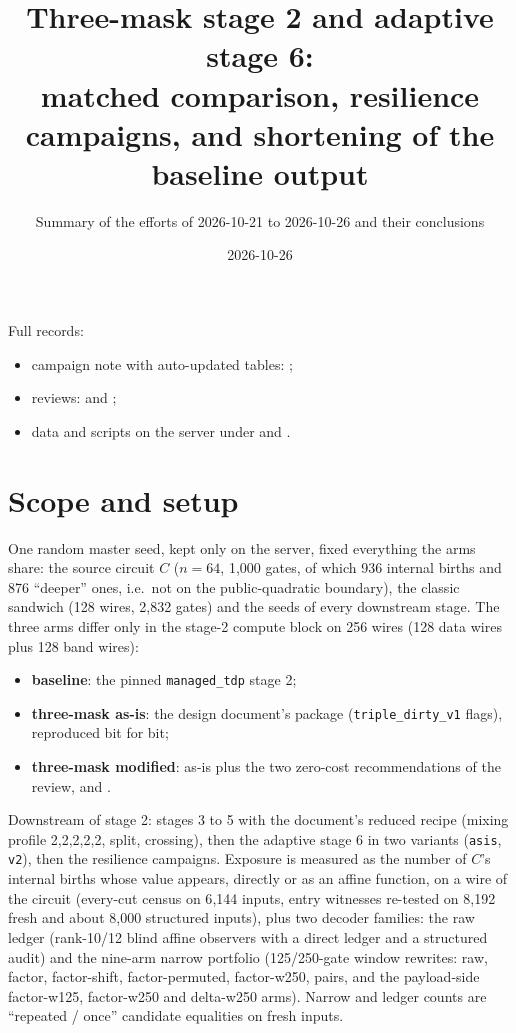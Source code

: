 \documentclass[11pt,a4paper]{article}
\title{Three-mask stage 2 and adaptive stage 6:\\matched comparison, resilience campaigns, and shortening of the baseline output}
\author{Summary of the efforts of 2026-10-21 to 2026-10-26 and their conclusions}
\date{2026-10-26}
\newcommand{\code}[1]{\texttt{#1}}
\begin{document}
\maketitle

\noindent Full records:
\begin{itemize}
\item campaign note with auto-updated tables: ;
\item reviews:  and ;
\item data and scripts on the server under  and .
\end{itemize}

\section{Scope and setup}
One random master seed, kept only on the server, fixed everything the arms share: the source circuit $C$ ($n=64$, 1{,}000 gates, of which 936 internal births and 876 ``deeper'' ones, i.e.\ not on the public-quadratic boundary), the classic sandwich (128 wires, 2{,}832 gates) and the seeds of every downstream stage. The three arms differ only in the stage-2 compute block on 256 wires (128 data wires plus 128 band wires):
\begin{itemize}
\item \textbf{baseline}: the pinned \code{managed\_tdp} stage 2;
\item \textbf{three-mask as-is}: the design document's package (\code{triple\_dirty\_v1} flags), reproduced bit for bit;
\item \textbf{three-mask modified}: as-is plus the two zero-cost recommendations of the review,  and .
\end{itemize}
Downstream of stage 2: stages 3 to 5 with the document's reduced recipe (mixing profile 2,2,2,2,2, split, crossing), then the adaptive stage 6 in two variants (\code{asis}, \code{v2}), then the resilience campaigns. Exposure is measured as the number of $C$'s internal births whose value appears, directly or as an affine function, on a wire of the circuit (every-cut census on 6{,}144 inputs, entry witnesses re-tested on 8{,}192 fresh and about 8{,}000 structured inputs), plus two decoder families: the raw ledger (rank-10/12 blind affine observers with a direct ledger and a structured audit) and the nine-arm narrow portfolio (125/250-gate window rewrites: raw, factor, factor-shift, factor-permuted, factor-w250, pairs, and the payload-side factor-w125, factor-w250 and delta-w250 arms). Narrow and ledger counts are ``repeated / once'' candidate equalities on fresh inputs.
\end{document}
